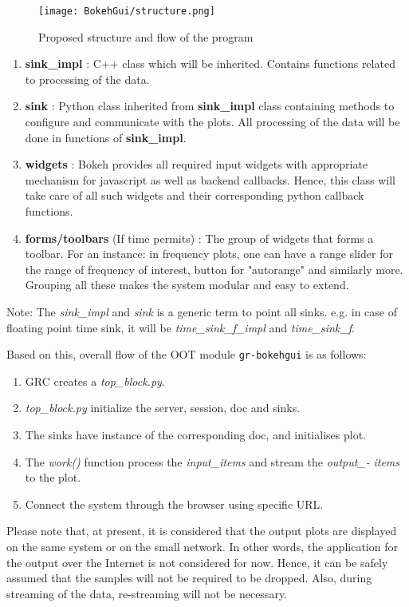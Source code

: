 \documentclass[a4paper, 11pt]{article}
\begin{document}
\begin{figure}[t]
\texttt{[image: BokehGui/structure.png]}
\caption{Proposed structure and flow of the program}
\label{fig:two}
\end{figure}

\begin{enumerate}
\item \textbf{sink\_impl} : C++ class which will be inherited. Contains functions related to processing of the data.
\item \textbf{sink }: Python class inherited from \textbf{sink\_impl }class containing methods to configure and communicate with the plots. All processing of the data will be done in functions of \textbf{sink\_impl}.
\item \textbf{widgets }: Bokeh provides all required input widgets with appropriate mechanism for javascript as well as backend callbacks. Hence, this class will take care of all such widgets and their corresponding python callback functions.
\item \textbf{forms/toolbars} (If time permits) : The group of widgets that forms a toolbar. For an instance: in frequency plots, one can have a range slider for the range of frequency of interest, button for "autorange" and similarly more. Grouping all these makes the system modular and easy to extend.
\end{enumerate}

Note: The \textit{sink\_impl }and \textit{sink }is a generic term to point all sinks. e.g. in case of floating point time sink, it will be \textit{time\_sink\_f\_impl }and \textit{time\_sink\_f}.

Based on this, overall flow of the OOT module \texttt{gr-bokehgui} is as follows:
\begin{enumerate}
\item GRC creates a \textit{top\_block.py}.
\item \textit{top\_block.py }initialize the server, session, doc and sinks.
\item The sinks have instance of the corresponding doc, and initialises plot.
\item The \textit{work()} function process the \textit{input\_items} and stream the \textit{output\_- }\textit{items} to the plot.
\item Connect the system through the browser using specific URL.
\end{enumerate}

Please note that, at present, it is considered that the output plots are displayed on the same system or on the small network. In other words, the application for the output over the Internet is not considered for now. Hence, it can be safely assumed that the samples will not be required to be dropped. Also, during streaming of the data, re-streaming will not be necessary.
\end{document}
